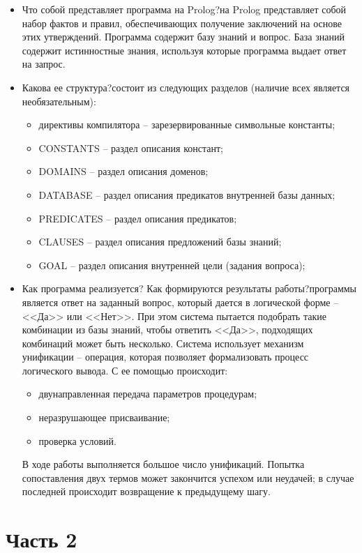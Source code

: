 \documentclass[14pt,a4paper]{scrreprt}
\begin{document}
\begin{itemize}
	\item Что собой представляет программа на Prolog? на Prolog представляет собой набор фактов и правил, обеспечивающих получение заключений на
	основе этих утверждений. Программа содержит базу знаний и вопрос. База знаний содержит истинностные знания, используя которые программа выдает ответ на запрос.
	\item Какова ее структура? состоит из следующих разделов (наличие всех является необязательным):
	\begin{itemize}
		\item директивы компилятора -- зарезервированные символьные константы;
		\item CONSTANTS -- раздел описания констант;
		\item DOMAINS -- раздел описания доменов;
		\item DATABASE -- раздел описания предикатов внутренней базы данных;
		\item PREDICATES -- раздел описания предикатов;
		\item CLAUSES -- раздел описания предложений базы знаний;
		\item GOAL -- раздел описания внутренней цели (задания вопроса);
	\end{itemize}
	\item Как программа реализуется? Как формируются результаты работы? программы является ответ на заданный вопрос, который дается в логической форме -- <<Да>> или <<Нет>>. При этом система пытается подобрать такие комбинации из базы знаний, чтобы ответить <<Да>>, подходящих комбинаций может быть несколько. Система использует механизм унификации -- операция, которая позволяет формализовать процесс логического вывода. С ее помощью происходит:
	\begin{itemize}
		\item двунаправленная передача параметров процедурам;
		\item неразрушающее присваивание;
		\item проверка условий.
	\end{itemize}
	В ходе работы выполняется большое число унификаций. Попытка сопоставления двух термов может закончится успехом или неудачей; в случае последней происходит возвращение к предыдущему шагу.
\end{itemize}

\chapter{Часть 2}
\end{document}
